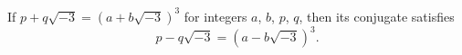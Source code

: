 If $p + q\sqrt{-3} = (a + b\sqrt{-3})^3$ for integers $a$, $b$, $p$, $q$, then its conjugate satisfies
$$p - q\sqrt{-3} = (a - b\sqrt{-3})^3.$$
